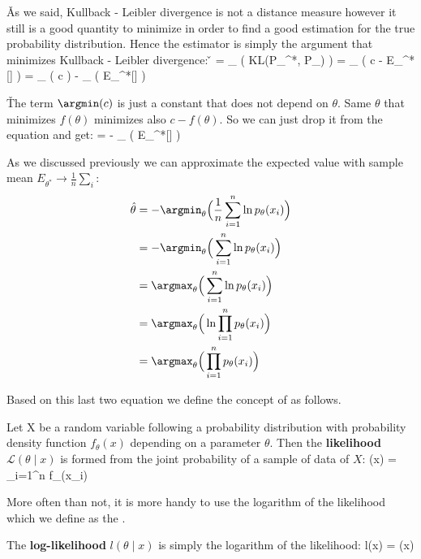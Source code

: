 \v

As we said, Kullback - Leibler divergence is not a distance measure however it still is a good quantity to minimize
in order to find a good estimation for the true probability distribution. Hence the estimator is simply the argument
that minimizes Kullback - Leibler divergence: \v

\bse
\hat{\theta} = \argmin_{\theta} \Big( KL(P_{\theta^{*}}, P_{\theta}) \Big) =
\argmin_{\theta} \Big( c - E_{\theta^{*}}[] \Big) =
\argmin_{\theta} ( c ) - \argmin_{\theta} \Big( E_{\theta^{*}}[] \Big)
\ese

\v

The term $\argmin(c)$ is just a constant that does not depend on $\theta$. Same $\theta$ that minimizes $f(\theta)$
minimizes also $c - f(\theta)$. So we can just drop it from the equation and get:
\bse
\hat{\theta} = - \argmin_{\theta} \Big( E_{\theta^{*}}[] \Big)
\ese

As we discussed previously we can approximate the expected value with sample mean $E_{\theta^{*}} \to \frac{1}{n}
\sum_{i}$:
\begingroup
\allowdisplaybreaks
\begin{align*}
\hat{\theta} &= - \argmin_{\theta} \Big( \frac{1}{n} \sum_{i=1}^{n} \ln {p_{\theta}}(x_{i}) \Big) \\
&= - \argmin_{\theta} \Big( \sum_{i=1}^{n} \ln {p_{\theta}}(x_{i}) \Big) \\
&= \argmax_{\theta} \Big( \sum_{i=1}^{n} \ln {p_{\theta}}(x_{i}) \Big) \\
&= \argmax_{\theta} \Big( \ln \prod_{i=1}^{n} {p_{\theta}}(x_{i}) \Big) \\
&= \argmax_{\theta} \Big( \prod_{i=1}^{n} {p_{\theta}}(x_{i}) \Big)
\end{align*}
\endgroup

Based on this last two equation we define the concept of  as follows.

\bd[Likelihood]
Let X be a random variable following a probability distribution with probability density function $f_{\theta}(x)$
depending on a parameter $\theta$. Then the \textbf{likelihood} $\mathcal {L} (\theta \mid x)$ is formed from the
joint probability of a sample of data of $X$:
\bse
{} (\theta \mid x) = \prod_{i=1}^{n} {f_{\theta}}(x_{i})
\ese
\ed

More often than not, it is more handy to use the logarithm of the likelihood which we define as the
.

The \textbf{log-likelihood} $l(\theta \mid x)$ is simply the logarithm of the likelihood:
\bse
l(\theta \mid x) = \ln {} (\theta \mid x)
\ese
\ed

